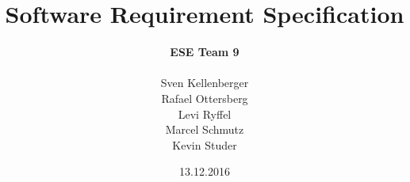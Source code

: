 \title{Software Requirement Specification}
\date{13.12.2016}
\author{\textbf{ESE Team 9} \\ \\Sven Kellenberger\\Rafael
Ottersberg\\Levi Ryffel\\Marcel Schmutz\\Kevin Studer}
